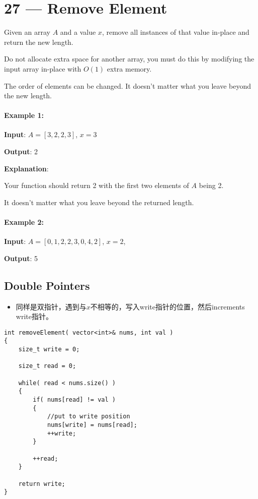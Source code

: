 \section{27 --- Remove Element}
Given an array $A$ and a value $x$, remove all instances of that value in-place and return the new length.

Do not allocate extra space for another array, you must do this by modifying the input array in-place with $O(1)$ extra memory.

The order of elements can be changed. It doesn't matter what you leave beyond the new length.

\paragraph{Example 1:}
\begin{flushleft}
\textbf{Input}: $A=[3,2,2,3]$, $x=3$

\textbf{Output}: 2

\textbf{Explanation}: 

Your function should return 2 with the first two elements of $A$ being 2. 

It doesn't matter what you leave beyond the returned length.
\end{flushleft}

\paragraph{Example 2:}

\begin{flushleft}
\textbf{Input}: $A = [0,1,2,2,3,0,4,2]$, $x = 2$,

\textbf{Output}: 5

\end{flushleft}

\subsection{Double Pointers}
\begin{itemize}
\item 同样是双指针，遇到与$x$不相等的，写入write指针的位置，然后increments write指针。
\end{itemize}

\setcounter{lstlisting}{0}
\begin{lstlisting}[style=customc, caption={Double Pointers}]
int removeElement( vector<int>& nums, int val )
{
    size_t write = 0;

    size_t read = 0;

    while( read < nums.size() )
    {
        if( nums[read] != val )
        {
            //put to write position
            nums[write] = nums[read];
            ++write;
        }

        ++read;
    }

    return write;
}
\end{lstlisting}